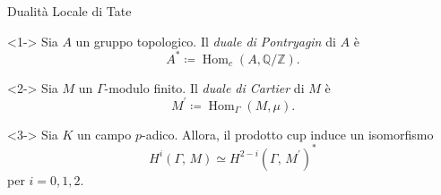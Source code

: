 \documentclass[pdf]{beamer}
\def\Q{\mathbb{Q}}
\def\Z{\mathbb{Z}}
\def\K{K}
\def\Ks{\overline{\K}}
\renewcommand{\H}[3]{H^{#1}( #2, \, #3 )}
\DeclareMathOperator{\Hom}{Hom}
\begin{document}
\begin{frame}{Dualità Locale di Tate}
	\begin{definition}<1->
		Sia $A$ un gruppo topologico. Il \textit{duale di Pontryagin} di $A$ è
		\[
			A^*\coloneqq\Hom_{c}{(A,\Q/\Z)}
			.\]
	\end{definition}
	\begin{definition}<2->
		Sia $M$ un $\Gamma$-modulo finito. Il \textit{duale di Cartier} di $M$ è
		\[
			M^\prime \coloneqq \Hom_{\Gamma}(M, \mu)
			.\]
	\end{definition}

	\begin{theorem}<3->
		Sia $K$ un campo $p$-adico. Allora, il prodotto cup induce un isomorfismo
		\[
			\H{i}{\Gamma}{M}\simeq\H{2-i}{\Gamma}{M^\prime}^*
		\]
		per $i=0,1,2$.
	\end{theorem}
\end{frame}
\end{document}
